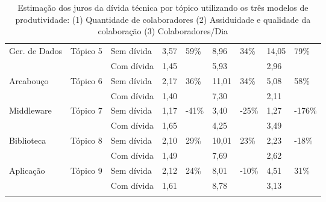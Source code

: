 \begin{longtable}{|l|l|l|l|l|l|l|l|l|}
\multirow{2}{*}{Ger. de Dados} & \multirow{2}{*}{Tópico 5}  & Sem dívida              & 3,57            & \multirow{2}{*}{59\%}   & 8,96            & \multirow{2}{*}{34\%}    & 14,05           & \multirow{2}{*}{79\%}   \\ \cline{3-4} \cline{6-6} \cline{8-8}
                               &                            & Com dívida           & 1,45            &                         & 5,93            &                          & 2,96            &                         \\ \hline
\multirow{2}{*}{Arcabouço}                      & \multirow{2}{*}{Tópico 6}  & Sem dívida              & 2,17            & \multirow{2}{*}{36\%}   & 11,01           & \multirow{2}{*}{34\%}    & 5,08            & \multirow{2}{*}{58\%}  \\ \cline{3-4} \cline{6-6} \cline{8-8}
                      &                            & Com dívida           & 1,40            &                         & 7,30            &                          & 2,11            &                         \\ \hline
\multirow{2}{*}{Middleware}                     & \multirow{2}{*}{Tópico 7}  & Sem dívida              & 1,17            & \multirow{2}{*}{-41\%}  & 3,40            & \multirow{2}{*}{-25\%}   & 1,27            & \multirow{2}{*}{-176\%} \\ \cline{3-4} \cline{6-6} \cline{8-8}
                     &                            & Com dívida           & 1,65            &                         & 4,25            &                          & 3,49            &                         \\ \hline
\multirow{2}{*}{Biblioteca}                     & \multirow{2}{*}{Tópico 8}  & Sem dívida              & 2,10            & \multirow{2}{*}{29\%}   & 10,01           & \multirow{2}{*}{23\%}    & 2,23            & \multirow{2}{*}{-18\%}  \\ \cline{3-4} \cline{6-6} \cline{8-8}
                     &                            & Com dívida           & 1,49            &                         & 7,69            &                          & 2,62            &                         \\ \hline
\multirow{2}{*}{Aplicação}                       & \multirow{2}{*}{Tópico 9}  & Sem dívida              & 2,12            & \multirow{2}{*}{24\%}   & 8,01            & \multirow{2}{*}{-10\%}   & 4,51            & \multirow{2}{*}{31\%}  \\ \cline{3-4} \cline{6-6} \cline{8-8}
                      &                            & Com dívida           & 1,61            &                         & 8,78            &                          & 3,13            &                         \\ \hline
\caption{Estimação dos juros da dívida técnica por tópico utilizando os três modelos de produtividade: (1) Quantidade de colaboradores (2) Assiduidade e qualidade da colaboração (3) Colaboradores/Dia}
\label{tab:estimacao_juros_topico_analise}
\end{longtable}

\normalsize



